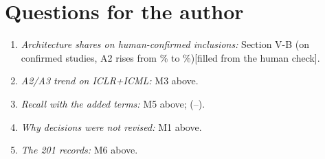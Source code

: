 \documentclass[10pt,a4paper]{article}
\newcommand{\pending}[1]{\textcolor{red!70!black}{[#1]}}
\begin{document}
\section*{Questions for the author}
\begin{enumerate}
  \item \emph{Architecture shares on human-confirmed inclusions:} Section V-B \ifhumancheck(on  confirmed studies, A2 rises from \% to \%)\else\pending{filled from the human check}\fi.
  \item \emph{A2/A3 trend on ICLR+ICML:} M3 above.
  \item \emph{Recall with the added terms:} M5 above;  (--).
  \item \emph{Why decisions were not revised:} M1 above.
  \item \emph{The 201 records:} M6 above.
\end{enumerate}
\end{document}
